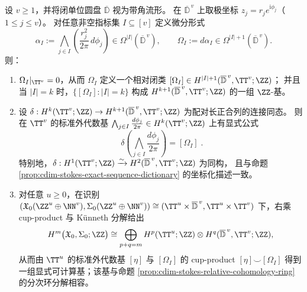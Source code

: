 \begin{theorem}\label{thm:cdim-stokes-explicit-relative-cohomology-basis}
设 \(v\ge 1\)，并将闭单位圆盘 \(\overline{\mathbb D}\) 视为带角流形。
在 \(\overline{\mathbb D}^{\,v}\) 上取极坐标 \(z_j=r_j e^{\mathrm{i}\phi_j}\)（\(1\le j\le v\)）。
对任意非空指标集 \(I\subseteq[v]\) 定义微分形式
\[
\alpha_{I}:=\bigwedge_{j\in I}\left(\frac{r_j^2}{2\pi}\,d\phi_j\right)\in\Omega^{|I|}(\overline{\mathbb D}^{\,v}),
\qquad
\Omega_{I}:=d\alpha_I\in\Omega^{|I|+1}(\overline{\mathbb D}^{\,v}).
\]
则：
\begin{enumerate}
  \item \(\Omega_I|_{\TT^{v}}=0\)，从而 \(\Omega_I\) 定义一个相对闭类
  \(
  [\Omega_I]\in H^{|I|+1}(\overline{\mathbb D}^{\,v},\TT^{v};\ZZ)
  \)；
  并且当 \(|I|=k\) 时，\(\{[\Omega_I]:|I|=k\}\) 构成 \(H^{k+1}(\overline{\mathbb D}^{\,v},\TT^{v};\ZZ)\) 的一组 \(\ZZ\)-基。
  \item 设 \(\delta:H^{k}(\TT^{v};\ZZ)\to H^{k+1}(\overline{\mathbb D}^{\,v},\TT^{v};\ZZ)\) 为配对长正合列的连接同态。
  则在 \(\TT^{v}\) 的标准外代数基
  \(
  \bigwedge_{j\in I}\frac{d\phi_j}{2\pi}\in H^{k}(\TT^{v};\ZZ)
  \)
  上有显式公式
  \[
  \boxed{\;
  \delta\!\left(\bigwedge_{j\in I}\frac{d\phi_j}{2\pi}\right)=[\Omega_I]\; } .
  \]
  特别地，\(\delta:H^{1}(\TT^{v};\ZZ)\xrightarrow{\sim}H^{2}(\overline{\mathbb D}^{\,v},\TT^{v};\ZZ)\) 为同构，
  且与命题 \ref{prop:cdim-stokes-exact-sequence-dictionary} 的坐标化描述一致。
  \item 对任意 \(u\ge 0\)，在识别
  \(
  (\mathfrak X_0(\ZZ^{u}\oplus\NN^{v}),\Sigma_0(\ZZ^{u}\oplus\NN^{v}))
  \cong
  (\TT^{u}\times \overline{\mathbb D}^{\,v},\TT^{u}\times\TT^{v})
  \)
  下，右乘 cup-product 与 Künneth 分解给出
  \[
  H^{m}\bigl(\mathfrak X_0,\Sigma_0;\ZZ\bigr)
  \cong
  \bigoplus_{p+q=m}H^{p}(\TT^{u};\ZZ)\otimes H^{q}(\overline{\mathbb D}^{\,v},\TT^{v};\ZZ),
  \]
  从而由 \(\TT^u\) 的标准外代数基 \([\eta]\) 与 \([\Omega_I]\) 的 cup-product
  \(
  [\eta]\smile[\Omega_I]
  \)
  得到一组显式可计算基；该基与命题 \ref{prop:cdim-stokes-relative-cohomology-ring} 的分次环分解相容。
\end{enumerate}
\end{theorem}
